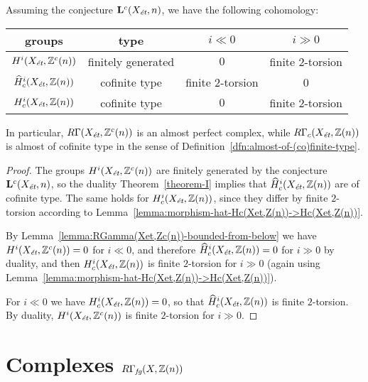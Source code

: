 \documentclass{article}
\numberwithin{equation}{section}
\begin{document}
\begin{lemma}
  \label{lemma:RGammac(Xet,Z(n))-almost-cofinite-type}
  Assuming the conjecture $\mathbf{L}^c (X_\et,n)$, we have the following
  cohomology:
  \begin{center}
    \renewcommand{\arraystretch}{1.5}
    \begin{tabular}{cccc}
      \hline
      \textbf{groups} & \textbf{type} & $i \ll 0$ & $i \gg 0$ \\
      \hline
      $H^i (X_\et, \ZZ^c (n))$ & finitely generated & $0$ & finite $2$-torsion \\
      $\widehat{H}^i_c (X_\et, \ZZ (n))$ & cofinite type & finite $2$-torsion & 0 \\
      $H^i_c (X_\et, \ZZ (n))$ & cofinite type & $0$ & finite $2$-torsion \\
      \hline
    \end{tabular}
  \end{center}
  In particular, $R\Gamma (X_\et, \ZZ^c (n))$ is an almost perfect complex,
  while $R\Gamma_c (X_\et, \ZZ (n))$ is almost of cofinite type in the sense of
  Definition~\ref{dfn:almost-of-(co)finite-type}.

  \begin{proof}
    The groups $H^i (X_\et, \ZZ^c (n))$ are finitely generated by the conjecture
    $\mathbf{L}^c (X_\et,n)$, so the duality Theorem~\ref{theorem-I} implies that
    $\widehat{H}^i_c (X_\et, \ZZ (n))$ are of cofinite type. The same holds for
    $H^i_c (X_\et, \ZZ(n))$, since they differ by finite $2$-torsion according to
    Lemma~\ref{lemma:morphism-hat-Hc(Xet,Z(n))->Hc(Xet,Z(n))}.

    By Lemma~\ref{lemma:RGamma(Xet,Zc(n))-bounded-from-below} we have
    $H^i (X_\et, \ZZ^c (n)) = 0$ for $i \ll 0$, and therefore
    $\widehat{H}^i_c (X_\et, \ZZ (n)) = 0$ for $i \gg 0$ by duality,
    and then $H^i_c (X_\et, \ZZ (n))$ is finite $2$-torsion for $i \gg 0$
    (again using Lemma~\ref{lemma:morphism-hat-Hc(Xet,Z(n))->Hc(Xet,Z(n))}).

    For $i \ll 0$ we have $H^i_c (X_\et, \ZZ (n)) = 0$, so that
    $\widehat{H}^i_c (X_\et, \ZZ (n))$ is finite $2$-torsion. By duality,
    $H^i (X_\et, \ZZ^c (n))$ is finite $2$-torsion for $i \gg 0$.
  \end{proof}
\end{lemma}


\section{Complexes $R\Gamma_\fg (X, \ZZ(n))$}
\label{sec:RGamma-fg}
\end{document}
